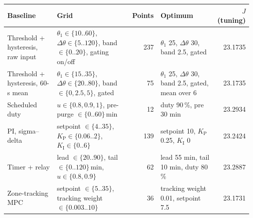 \begin{tabular}{p{3.2cm}p{5.4cm}rp{4.2cm}r}
\toprule
Baseline & Grid & Points & Optimum & $J$ (tuning)\\
\midrule
Threshold + hysteresis, raw input & $\theta_1\in\{10..60\}$, $\Delta\theta\in\{5..120\}$, band $\in\{0..20\}$, gating on/off & 237 & $\theta_1$ 25, $\Delta\theta$ 30, band 2.5, gated & 23.1735\\
Threshold + hysteresis, 60-s mean & $\theta_1\in\{15..35\}$, $\Delta\theta\in\{20..80\}$, band $\in\{0,2.5,5\}$, gated & 75 & $\theta_1$ 25, $\Delta\theta$ 30, band 2.5, gated, mean over 6 & 23.1735\\
Scheduled duty & $u\in\{0.8,0.9,1\}$, pre-purge $\in\{0..60\}$\,min & 12 & duty 90\,\%, pre 30 min & 23.2934\\
PI, sigma--delta & setpoint $\in\{4..35\}$, $K_\mathrm{P}\in\{0.06..2\}$, $K_\mathrm{I}\in\{0..6\}$ & 139 & setpoint 10, $K_\mathrm{P}$ 0.25, $K_\mathrm{I}$ 0 & 23.2424\\
Timer + relay & lead $\in\{20..90\}$, tail $\in\{0..120\}$\,min, $u\in\{0.8,0.9\}$ & 62 & lead 55 min, tail 10 min, duty 80\,\% & 23.2887\\
Zone-tracking MPC & setpoint $\in\{5..35\}$, tracking weight $\in\{0.003..10\}$ & 36 & tracking weight 0.01, setpoint 7.5 & 23.1731\\
\bottomrule
\end{tabular}

